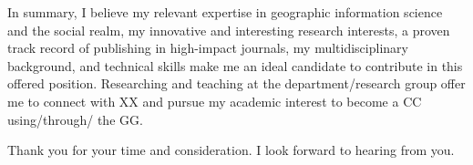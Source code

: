 
In summary, I believe my relevant expertise in geographic information science and the social realm, my innovative and interesting research interests, a proven track record of publishing in high-impact journals, my multidisciplinary background, and technical skills make me an ideal candidate to contribute in this offered position. Researching and teaching at the department/research group offer me to connect with XX and pursue my academic interest to become a CC using/through/ the GG.\par

Thank you for your time and consideration. I look forward to hearing from you.\par




\begin{comment}

NOTES

Who you are?

The cover letter needs to answer these questions.
Why do your fit? Why do you apply?

We need to say our goals, teaching goals, or research goals... You need to present you as unique, and be persuasive... engagen in your letter

A cover letter is a persuasive document that directly connects you to the department, articulating your future contributions.

You need to do research on the department, 

Dont talk a lot about your research if not in the future contributions...

Adjusting your needs, what they need and how you fit there. Based on what you done, and go 


TIPS
- 2 pages max. (1 and half pages)
- 11-12 font size - readible... 
- Personalize: 
- Future-oriented and focused
- Provides evidence...


- Introduction

What position are you applying to?

Open up with a story, more narrative it is an option. Be creative. 

Who are you?


Why are you applying (to this job)?

- Major sections: ( Research / Teaching / Service) it depends of the job position, so read very well the position. 


\end{comment}
